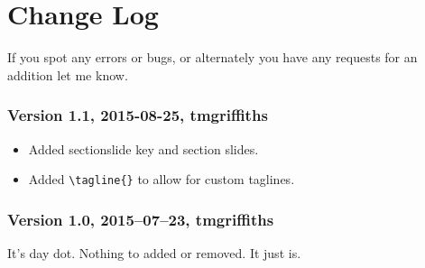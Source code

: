 \documentclass[a4paper,oneside,11pt]{article}
\newcommand{\command}[1]{\texttt{\color{UOWdarkgreen}#1}}
\begin{document}
\vspace{1em}\begin{center}\ccbysa\end{center}


\section{Change Log}
If you spot any errors or bugs, or alternately you have any requests for an addition let me know.

\subsubsection*{Version 1.1, 2015-08-25, tmgriffiths}
\begin{itemize}
\item Added sectionslide key and section slides.
\item Added \command{\command{\textbackslash{}tagline\{\}}} to allow for custom taglines.
\end{itemize}

\subsubsection*{Version 1.0, 2015–07–23, tmgriffiths}
It's day dot. Nothing to added or removed. It just is.
\end{document}

